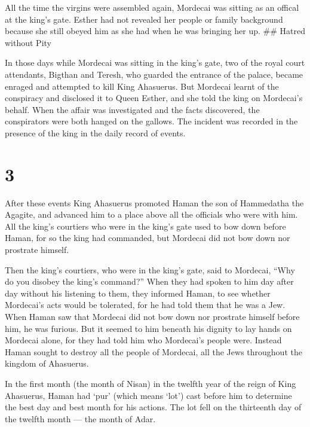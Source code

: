  All the time the virgins were assembled again, Mordecai
was sitting as an offical at the king's gate.  Esther had
not revealed her people or family background because she still obeyed
him as she had when he was bringing her up. \#\# Hatred without Pity

 In those days while Mordecai was sitting in the king's
gate, two of the royal court attendants, Bigthan and Teresh, who guarded
the entrance of the palace, became enraged and attempted to kill King
Ahasuerus.  But Mordecai learnt of the conspiracy and
disclosed it to Queen Esther, and she told the king on Mordecai's
behalf.  When the affair was investigated and the facts
discovered, the conspirators were both hanged on the gallows. The
incident was recorded in the presence of the king in the daily record of
events.

\hypertarget{section-2}{%
\section{3}\label{section-2}}

 After these events King Ahasuerus promoted Haman the son of
Hammedatha the Agagite, and advanced him to a place above all the
officials who were with him.  All the king's courtiers who
were in the king's gate used to bow down before Haman, for so the king
had commanded, but Mordecai did not bow down nor prostrate himself.

 Then the king's courtiers, who were in the king's gate,
said to Mordecai, ``Why do you disobey the king's command?''
 When they had spoken to him day after day without his
listening to them, they informed Haman, to see whether Mordecai's acts
would be tolerated, for he had told them that he was a Jew. 
When Haman saw that Mordecai did not bow down nor prostrate himself
before him, he was furious.  But it seemed to him beneath
his dignity to lay hands on Mordecai alone, for they had told him who
Mordecai's people were. Instead Haman sought to destroy all the people
of Mordecai, all the Jews throughout the kingdom of Ahasuerus.

 In the first month (the month of Nisan) in the twelfth year
of the reign of King Ahasuerus, Haman had `pur' (which means `lot') cast
before him to determine the best day and best month for his actions. The
lot fell on the thirteenth day of the twelfth month --- the month of
Adar.


